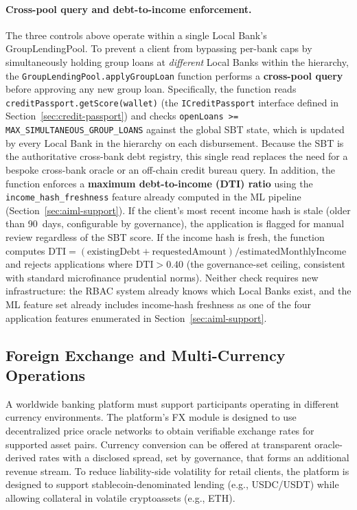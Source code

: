 \documentclass[12pt,a4paper]{report}
\begin{document}
\paragraph{Cross-pool query and debt-to-income enforcement.}
The three controls above operate within a single Local Bank's GroupLendingPool.  To prevent a client from bypassing per-bank caps by simultaneously holding group loans at \emph{different} Local Banks within the hierarchy, the \texttt{GroupLendingPool.applyGroupLoan} function performs a \textbf{cross-pool query} before approving any new group loan.  Specifically, the function reads \texttt{creditPassport.getScore(wallet)} (the \texttt{ICreditPassport} interface defined in Section~\ref{sec:credit-passport}) and checks \texttt{openLoans >= MAX\_SIMULTANEOUS\_GROUP\_LOANS} against the global SBT state, which is updated by every Local Bank in the hierarchy on each disbursement.  Because the SBT is the authoritative cross-bank debt registry, this single read replaces the need for a bespoke cross-bank oracle or an off-chain credit bureau query.  In addition, the function enforces a \textbf{maximum debt-to-income (DTI) ratio} using the \texttt{income\_hash\_freshness} feature already computed in the ML pipeline (Section~\ref{sec:aiml-support}).  If the client's most recent income hash is stale (older than 90~days, configurable by governance), the application is flagged for manual review regardless of the SBT score.  If the income hash is fresh, the function computes $\text{DTI} = (\text{existingDebt} + \text{requestedAmount}) / \text{estimatedMonthlyIncome}$ and rejects applications where $\text{DTI} > 0.40$ (the governance-set ceiling, consistent with standard microfinance prudential norms).  Neither check requires new infrastructure: the RBAC system already knows which Local Banks exist, and the ML feature set already includes income-hash freshness as one of the four application features enumerated in Section~\ref{sec:aiml-support}.

\subsection{Foreign Exchange and Multi-Currency Operations}

A worldwide banking platform must support participants operating in different currency environments. The platform's FX module is designed to use decentralized price oracle networks to obtain verifiable exchange rates for supported asset pairs. Currency conversion can be offered at transparent oracle-derived rates with a disclosed spread, set by governance, that forms an additional revenue stream. To reduce liability-side volatility for retail clients, the platform is designed to support stablecoin-denominated lending (e.g., USDC/USDT) while allowing collateral in volatile cryptoassets (e.g., ETH).
\end{document}
